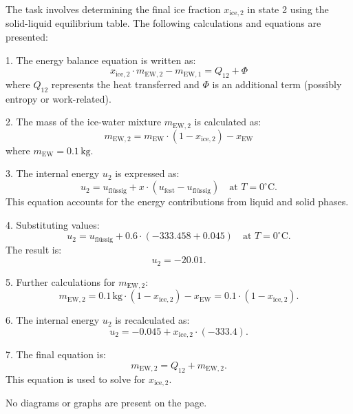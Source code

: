 The task involves determining the final ice fraction \( x_{\text{ice},2} \) in state 2 using the solid-liquid equilibrium table. The following calculations and equations are presented:

1. The energy balance equation is written as:  
\[
x_{\text{ice},2} \cdot m_{\text{EW},2} - m_{\text{EW},1} = Q_{12} + \Phi
\]  
where \( Q_{12} \) represents the heat transferred and \( \Phi \) is an additional term (possibly entropy or work-related).

2. The mass of the ice-water mixture \( m_{\text{EW},2} \) is calculated as:  
\[
m_{\text{EW},2} = m_{\text{EW}} \cdot \left( 1 - x_{\text{ice},2} \right) - x_{\text{EW}}
\]  
where \( m_{\text{EW}} = 0.1 \, \text{kg} \).

3. The internal energy \( u_2 \) is expressed as:  
\[
u_2 = u_{\text{flüssig}} + x \cdot \left( u_{\text{fest}} - u_{\text{flüssig}} \right) \quad \text{at } T = 0^\circ\text{C}.
\]  
This equation accounts for the energy contributions from liquid and solid phases.

4. Substituting values:  
\[
u_2 = u_{\text{flüssig}} + 0.6 \cdot \left( -333.458 + 0.045 \right) \quad \text{at } T = 0^\circ\text{C}.
\]  
The result is:  
\[
u_2 = -20.01.
\]

5. Further calculations for \( m_{\text{EW},2} \):  
\[
m_{\text{EW},2} = 0.1 \, \text{kg} \cdot \left( 1 - x_{\text{ice},2} \right) - x_{\text{EW}} = 0.1 \cdot \left( 1 - x_{\text{ice},2} \right).
\]

6. The internal energy \( u_2 \) is recalculated as:  
\[
u_2 = -0.045 + x_{\text{ice},2} \cdot \left( -333.4 \right).
\]

7. The final equation is:  
\[
m_{\text{EW},2} = Q_{12} + m_{\text{EW},2}.
\]  
This equation is used to solve for \( x_{\text{ice},2} \).

No diagrams or graphs are present on the page.